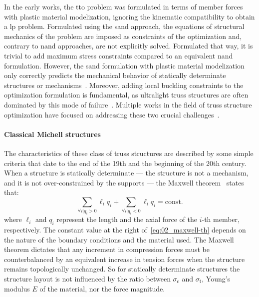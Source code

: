 In the early works, the \gls{tto} problem was formulated in terms of member forces~ with plastic material modelization, ignoring the kinematic compatibility to obtain a \gls{lp} problem. Formulated using the \gls{sand} approach, the equations of structural mechanics of the problem are imposed as constraints of the optimization and, contrary to \gls{nand} approaches, are not explicitly solved. Formulated that way, it is trivial to add maximum stress constraints compared to an equivalent \gls{nand} formulation. However, the \gls{sand} formulation with plastic material modelization only correctly predicts the mechanical behavior of statically determinate structures or mechanisms~. Moreover, adding local buckling constraints to the optimization formulation is fundamental, as ultralight truss structures are often dominated by this mode of failure~. Multiple works in the field of truss structure optimization have focused on addressing these two crucial challenges~.

\paragraph{Classical Michell structures} \label{sec:02_michell}
The characteristics of these class of truss structures are described by some simple criteria that date to the end of the 19th and the beginning of the 20th century. When a structure is statically determinate — \ie the structure is not a mechanism, and it is not over-constrained by the supports — the Maxwell theorem~ states that:
\begin{equation} \label{eq:02_maxwell-th}
    \sum_{\forall i | q_i>0}\ell_iq_i + \sum_{\forall i | q_i<0}\ell_iq_i = \textrm{const.}
\end{equation}
where $\ell_i$ and $q_i$ represent the length and the axial force of the $i$-th member, respectively. The constant value at the right of~\eqref{eq:02_maxwell-th} depends on the nature of the boundary conditions and the material used. The Maxwell theorem dictates that any increment in compression forces must be counterbalanced by an equivalent increase in tension forces when the structure remains topologically unchanged. So for statically determinate structures the structure layout is not influenced by the ratio between $\sigma_\text{c}$ and $\sigma_\text{t}$, Young's modulus $E$ of the material, nor the force magnitude.


